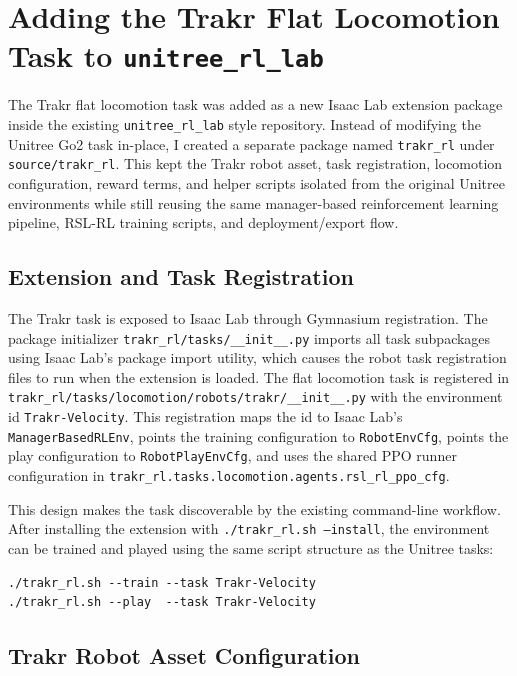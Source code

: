 \section{Adding the Trakr Flat Locomotion Task to \texttt{unitree\_rl\_lab}}

The Trakr flat locomotion task was added as a new Isaac Lab extension package inside the existing
\texttt{unitree\_rl\_lab} style repository. Instead of modifying the Unitree Go2 task in-place, I created
a separate package named \texttt{trakr\_rl} under \texttt{source/trakr\_rl}. This kept the Trakr robot
asset, task registration, locomotion configuration, reward terms, and helper scripts isolated from the
original Unitree environments while still reusing the same manager-based reinforcement learning pipeline,
RSL-RL training scripts, and deployment/export flow.

\subsection{Extension and Task Registration}

The Trakr task is exposed to Isaac Lab through Gymnasium registration. The package initializer
\texttt{trakr\_rl/tasks/\_\_init\_\_.py} imports all task subpackages using Isaac Lab's package import
utility, which causes the robot task registration files to run when the extension is loaded. The flat
locomotion task is registered in
\texttt{trakr\_rl/tasks/locomotion/robots/trakr/\_\_init\_\_.py} with the environment id
\texttt{Trakr-Velocity}. This registration maps the id to Isaac Lab's
\texttt{ManagerBasedRLEnv}, points the training configuration to \texttt{RobotEnvCfg}, points the play
configuration to \texttt{RobotPlayEnvCfg}, and uses the shared PPO runner configuration in
\texttt{trakr\_rl.tasks.locomotion.agents.rsl\_rl\_ppo\_cfg}.

This design makes the task discoverable by the existing command-line workflow. After installing the
extension with \texttt{./trakr\_rl.sh --install}, the environment can be trained and played using the same
script structure as the Unitree tasks:

\begin{verbatim}
./trakr_rl.sh --train --task Trakr-Velocity
./trakr_rl.sh --play  --task Trakr-Velocity
\end{verbatim}

\subsection{Trakr Robot Asset Configuration}

